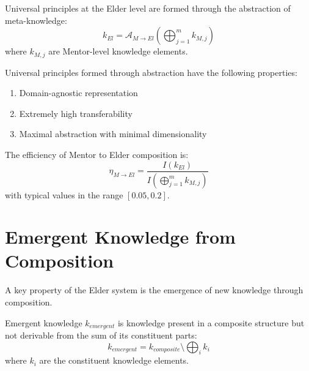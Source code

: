 \begin{definition}
Universal principles at the Elder level are formed through the abstraction of meta-knowledge:
\begin{equation}
k_{El} = \mathcal{A}_{M \rightarrow El}\left(\bigoplus_{j=1}^{m} k_{M,j}\right)
\end{equation}
where $k_{M,j}$ are Mentor-level knowledge elements.
\end{definition}

\begin{theorem}
Universal principles formed through abstraction have the following properties:
\begin{enumerate}
    \item Domain-agnostic representation
    \item Extremely high transferability
    \item Maximal abstraction with minimal dimensionality
\end{enumerate}
\end{theorem}

\begin{theorem}
The efficiency of Mentor to Elder composition is:
\begin{equation}
\eta_{M \rightarrow El} = \frac{I(k_{El})}{I\left(\bigoplus_{j=1}^{m} k_{M,j}\right)}
\end{equation}
with typical values in the range $[0.05, 0.2]$.
\end{theorem}

\section{Emergent Knowledge from Composition}



A key property of the Elder system is the emergence of new knowledge through composition.

\begin{definition}
Emergent knowledge $k_{emergent}$ is knowledge present in a composite structure but not derivable from the sum of its constituent parts:
\begin{equation}
k_{emergent} = k_{composite} \setminus \bigoplus_{i} k_i
\end{equation}
where $k_i$ are the constituent knowledge elements.
\end{definition}

